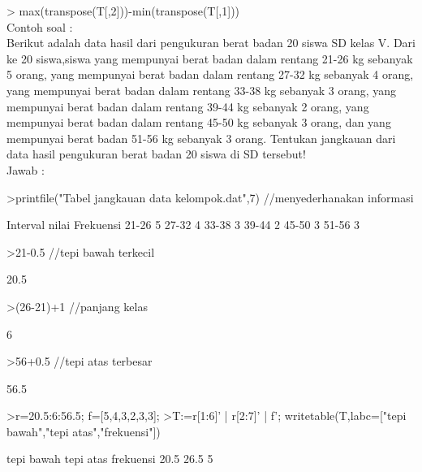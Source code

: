 \documentclass[a4paper,10pt]{article}
\begin{document}
\begin{eulernotebook}
\begin{eulercomment}
\begin{eulercomment}
\begin{eulercomment}
\begin{eulercomment}
\begin{eulercomment}
\begin{eulercomment}
\begin{eulercomment}
\begin{eulercomment}
\begin{eulercomment}
\begin{eulercomment}
\begin{eulercomment}
\begin{eulercomment}
\begin{eulercomment}
\textgreater{} max(transpose(T[,2]))-min(transpose(T[,1]))\\
Contoh soal :\\
Berikut adalah data hasil dari pengukuran berat badan 20 siswa SD
kelas V. Dari ke 20 siswa,siswa yang mempunyai berat badan dalam
rentang 21-26 kg sebanyak 5 orang, yang mempunyai berat badan dalam
rentang 27-32 kg sebanyak 4 orang, yang mempunyai berat badan dalam
rentang 33-38 kg sebanyak 3 orang, yang mempunyai berat badan dalam
rentang 39-44 kg sebanyak 2 orang, yang mempunyai berat badan dalam
rentang 45-50 kg sebanyak 3 orang, dan yang mempunyai berat badan
51-56 kg sebanyak 3 orang. Tentukan jangkauan dari\\
data hasil pengukuran berat badan 20 siswa di SD tersebut!\\
Jawab :
\end{eulercomment}
\begin{eulerprompt}
>printfile("Tabel jangkauan data kelompok.dat",7) //menyederhanakan informasi
\end{eulerprompt}
\begin{euleroutput}
        Interval nilai     Frekuensi
            21-26              5
            27-32              4
            33-38              3
            39-44              2
            45-50              3
            51-56              3
\end{euleroutput}
\begin{eulerprompt}
>21-0.5 //tepi bawah terkecil
\end{eulerprompt}
\begin{euleroutput}
  20.5
\end{euleroutput}
\begin{eulerprompt}
>(26-21)+1 //panjang kelas
\end{eulerprompt}
\begin{euleroutput}
  6
\end{euleroutput}
\begin{eulerprompt}
>56+0.5 //tepi atas terbesar
\end{eulerprompt}
\begin{euleroutput}
  56.5
\end{euleroutput}
\begin{eulerprompt}
>r=20.5:6:56.5; f=[5,4,3,2,3,3];
>T:=r[1:6]' | r[2:7]' | f'; writetable(T,labc=["tepi bawah","tepi atas","frekuensi"])
\end{eulerprompt}
\begin{euleroutput}
   tepi bawah tepi atas frekuensi
         20.5      26.5         5

\end{euleroutput}
\end{eulercomment}
\end{eulercomment}
\end{eulercomment}
\end{eulercomment}
\end{eulercomment}
\end{eulercomment}
\end{eulercomment}
\end{eulercomment}
\end{eulercomment}
\end{eulercomment}
\end{eulercomment}
\end{eulercomment}
\end{eulernotebook}
\end{document}
